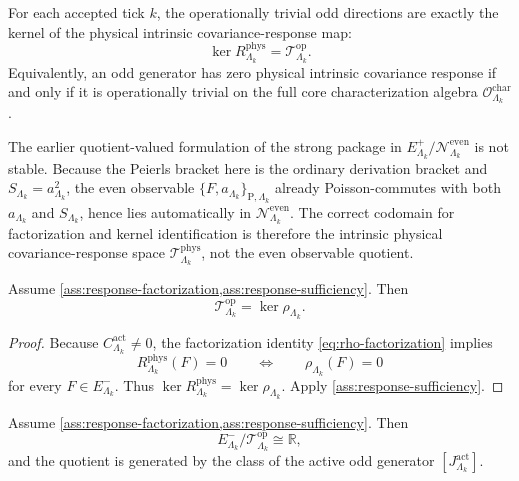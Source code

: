 \documentclass[11pt]{article}
\begin{document}
\begin{assumption}
\label{ass:response-sufficiency}
For each accepted tick \(k\), the operationally trivial odd directions are exactly the kernel of the
physical intrinsic covariance-response map:
\[
 \ker R^{\mathrm{phys}}_{\Lambda_k}
 =
 \mathcal T^{\mathrm{op}}_{\Lambda_k}.
\]
Equivalently, an odd generator has zero physical intrinsic covariance response if and only if it is
operationally trivial on the full core characterization algebra \(\mathcal O^{\mathrm{char}}_{\Lambda_k}\).
\end{assumption}

\begin{remark}
\label{rem:response-quotient-obstruction}
The earlier quotient-valued formulation of the strong package in
\(
E^+_{\Lambda_k}/\mathcal N^{\mathrm{even}}_{\Lambda_k}
\)
is not stable.
Because the Peierls bracket here is the ordinary derivation bracket and \(S_{\Lambda_k}=a_{\Lambda_k}^2\),
the even observable \(\{F,a_{\Lambda_k}\}_{\mathrm P,\Lambda_k}\) already Poisson-commutes with
both \(a_{\Lambda_k}\) and \(S_{\Lambda_k}\), hence lies automatically in
\(\mathcal N^{\mathrm{even}}_{\Lambda_k}\).
The correct codomain for factorization and kernel identification is therefore the intrinsic
physical covariance-response space \(\mathcal T^{\mathrm{phys}}_{\Lambda_k}\), not the even
observable quotient.
\end{remark}

\begin{proposition}
\label{prop:T-kerrho}
Assume \cref{ass:response-factorization,ass:response-sufficiency}. Then
\[
\mathcal T^{\mathrm{op}}_{\Lambda_k}=\ker\rho_{\Lambda_k}.
\]
\end{proposition}

\begin{proof}
Because \(C^{\mathrm{act}}_{\Lambda_k}\neq 0\), the factorization identity
\eqref{eq:rho-factorization} implies
\[
R^{\mathrm{phys}}_{\Lambda_k}(F)=0
\qquad\Longleftrightarrow\qquad
\rho_{\Lambda_k}(F)=0
\]
for every \(F\in E^-_{\Lambda_k}\).
Thus
\(
\ker R^{\mathrm{phys}}_{\Lambda_k}
=
\ker\rho_{\Lambda_k}.
\)
Apply \cref{ass:response-sufficiency}.
\end{proof}

\begin{corollary}
\label{cor:rank-one-char}
Assume \cref{ass:response-factorization,ass:response-sufficiency}. Then
\[
E^-_{\Lambda_k}/\mathcal T^{\mathrm{op}}_{\Lambda_k}\cong \mathbb R,
\]
and the quotient is generated by the class of the active odd generator
\([J^{\mathrm{act}}_{\Lambda_k}]\).
\end{corollary}
\end{document}
